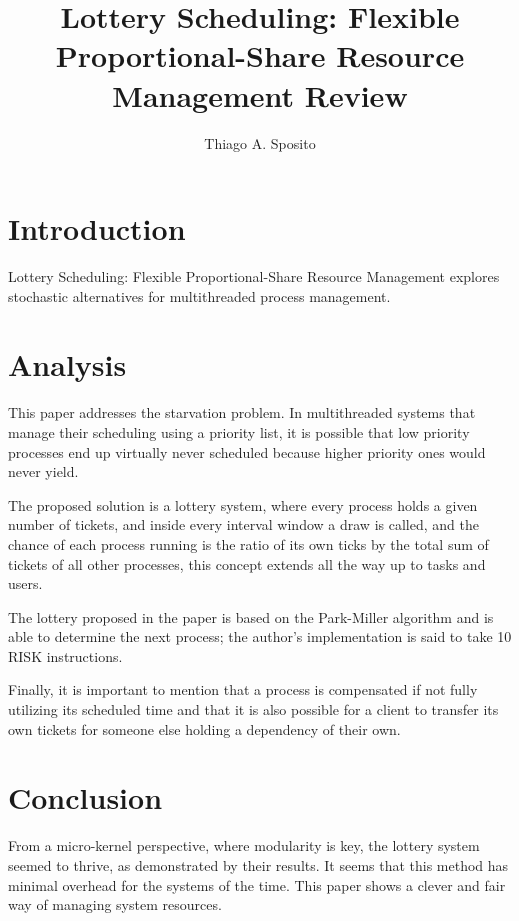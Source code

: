 \documentclass[12pt]{article}
\title{Lottery Scheduling: Flexible Proportional-Share Resource Management Review}
\author{Thiago A. Sposito\inst{1} }
\begin{document}
 

\maketitle


\section{Introduction}
Lottery Scheduling: Flexible Proportional-Share Resource Management explores stochastic alternatives for multithreaded process management\cite{waldspurger1994lottery}.
\section{Analysis}
This paper addresses the starvation problem. In multithreaded systems that manage their scheduling using a priority list, it is possible that low priority processes end up virtually never scheduled because higher priority ones would never yield.

The proposed solution is a lottery system, where every process holds a given number of tickets, and inside every interval window a draw is called, and the chance of each process running is the ratio of its own ticks by the total sum of tickets of all other processes, this concept extends all the way up to tasks and users.

The lottery proposed in the paper is based on the Park-Miller algorithm \cite{park1988random} and is able to determine the next process; the author's implementation is said to take 10 RISK instructions.

Finally, it is important to mention that a process is compensated if not fully utilizing its scheduled time and that it is also possible for a client to transfer its own tickets for someone else holding a dependency of their own. 
\section{Conclusion}
From a micro-kernel perspective, where modularity is key, the lottery system seemed to thrive, as demonstrated by their results. It seems that this method has minimal overhead for the systems of the time. This paper shows a clever and fair way of managing system resources.


\end{document}
